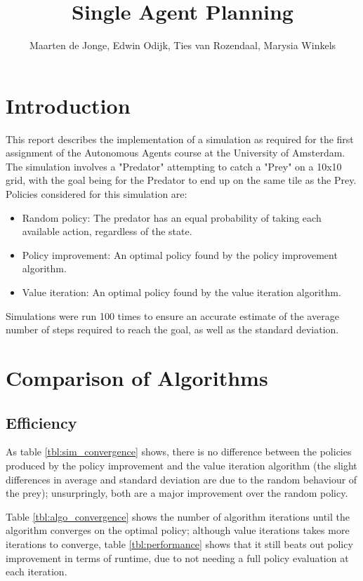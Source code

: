 \documentclass[a4paper, 12pt]{article}
\begin{document}
\title{Single Agent Planning}
\author{Maarten de Jonge, Edwin Odijk, Ties van Rozendaal, Marysia Winkels}
\maketitle

\section*{Introduction}
This report describes the implementation of a simulation as required for the first assignment of the Autonomous Agents course at the University of Amsterdam. The simulation involves a "Predator" attempting to catch a "Prey" on a 10x10 grid, with the goal being for the Predator to end up on the same tile as the Prey.\\
Policies considered for this simulation are:
\begin{itemize}
	\item Random policy: The predator has an equal probability of taking each
		available action, regardless of the state.
	\item Policy improvement: An optimal policy found by the policy improvement
		algorithm.
	\item Value iteration: An optimal policy found by the value iteration
		algorithm.
\end{itemize}

Simulations were run 100 times to ensure an accurate estimate of the average number of steps required to reach the goal, as well as the standard deviation.

\section*{Comparison of Algorithms}
\subsection*{Efficiency}
As table \ref{tbl:sim_convergence} shows, there is no difference between the
policies produced by the policy improvement and the value iteration algorithm
(the slight differences in average and standard deviation are due to the random
behaviour of the prey); unsurpringly, both are a major improvement over the
random policy.

Table \ref{tbl:algo_convergence} shows the number of algorithm
iterations until the algorithm converges on the optimal policy; although value
iterations takes more iterations to converge, table \ref{tbl:performance} shows
that it still beats out policy improvement in terms of runtime, due to not
needing a full policy evaluation at each iteration.
\end{document}
